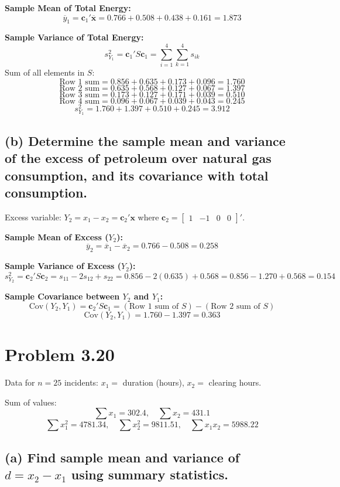 \documentclass[11pt,a4paper]{article}
\begin{document}
\textbf{Sample Mean of Total Energy:}
\[
\overline{y}_1 = \mathbf{c}_1' \overline{\mathbf{x}} = 0.766 + 0.508 + 0.438 + 0.161 = 1.873
\]

\textbf{Sample Variance of Total Energy:}
\[
s_{Y_1}^2 = \mathbf{c}_1' S \mathbf{c}_1 = \sum_{i=1}^4 \sum_{k=1}^4 s_{ik}
\]
Sum of all elements in $S$:
\[
\text{Row 1 sum} = 0.856 + 0.635 + 0.173 + 0.096 = 1.760
\]
\[
\text{Row 2 sum} = 0.635 + 0.568 + 0.127 + 0.067 = 1.397
\]
\[
\text{Row 3 sum} = 0.173 + 0.127 + 0.171 + 0.039 = 0.510
\]
\[
\text{Row 4 sum} = 0.096 + 0.067 + 0.039 + 0.043 = 0.245
\]
\[
s_{Y_1}^2 = 1.760 + 1.397 + 0.510 + 0.245 = 3.912
\]

\subsection*{(b) Determine the sample mean and variance of the excess of petroleum over natural gas consumption, and its covariance with total consumption.}

Excess variable: $Y_2 = x_1 - x_2 = \mathbf{c}_2' \mathbf{x}$ where $\mathbf{c}_2 = \begin{bmatrix} 1 & -1 & 0 & 0 \end{bmatrix}'$.

\textbf{Sample Mean of Excess ($Y_2$):}
\[
\overline{y}_2 = \overline{x}_1 - \overline{x}_2 = 0.766 - 0.508 = 0.258
\]

\textbf{Sample Variance of Excess ($Y_2$):}
\[
s_{Y_2}^2 = \mathbf{c}_2' S \mathbf{c}_2 = s_{11} - 2s_{12} + s_{22} = 0.856 - 2(0.635) + 0.568 = 0.856 - 1.270 + 0.568 = 0.154
\]

\textbf{Sample Covariance between $Y_2$ and $Y_1$:}
\[
\text{Cov}(Y_2, Y_1) = \mathbf{c}_2' S \mathbf{c}_1 = (\text{Row 1 sum of } S) - (\text{Row 2 sum of } S)
\]
\[
\text{Cov}(Y_2, Y_1) = 1.760 - 1.397 = 0.363
\]

\hr

\section*{Problem 3.20}

Data for $n=25$ incidents: $x_1 =$ duration (hours), $x_2 =$ clearing hours.

Sum of values:
\[
\sum x_1 = 302.4, \quad \sum x_2 = 431.1
\]
\[
\sum x_1^2 = 4781.34, \quad \sum x_2^2 = 9811.51, \quad \sum x_1 x_2 = 5988.22
\]

\subsection*{(a) Find sample mean and variance of $d = x_2 - x_1$ using summary statistics.}
\end{document}

